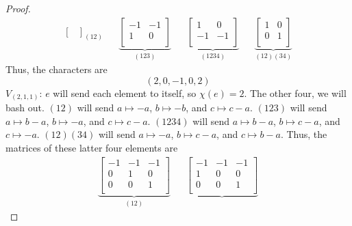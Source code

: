 \documentclass[../psets.tex]{subfiles}
\begin{document}
\begin{enumerate}
\begin{proof}
\begin{align*}
{\begin{bmatrix}
                \end{bmatrix}
            }_{(12)}&&
            \underbrace{
                \begin{bmatrix}
                    -1 & -1\\
                    1 & 0\\
                \end{bmatrix}
            }_{(123)}&&
            \underbrace{
                \begin{bmatrix}
                    1 & 0\\
                    -1 & -1\\
                \end{bmatrix}
            }_{(1234)}&&
            \underbrace{
                \begin{bmatrix}
                    1 & 0\\
                    0 & 1\\
                \end{bmatrix}
            }_{(12)(34)}
        \end{align*}
        Thus, the characters are
        \begin{equation*}
            (2,0,-1,0,2)
        \end{equation*}
        \underline{$V_{(2,1,1)}$}: $e$ will send each element to itself, so $\chi(e)=2$. The other four, we will bash out. $(12)$ will send $a\mapsto -a$, $b\mapsto -b$, and $c\mapsto c-a$. $(123)$ will send $a\mapsto b-a$, $b\mapsto -a$, and $c\mapsto c-a$. $(1234)$ will send $a\mapsto b-a$, $b\mapsto c-a$, and $c\mapsto -a$. $(12)(34)$ will send $a\mapsto -a$, $b\mapsto c-a$, and $c\mapsto b-a$. Thus, the matrices of these latter four elements are
        \begin{align*}
            \underbrace{
                \begin{bmatrix}
                    -1 & -1 & -1\\
                    0 & 1 & 0\\
                    0 & 0 & 1\\
                \end{bmatrix}
            }_{(12)}&&
            \underbrace{
                \begin{bmatrix}
                    -1 & -1 & -1\\
                    1 & 0 & 0\\
                    0 & 0 & 1\\
                \end{bmatrix}
}
\end{align*}
\end{proof}
\end{enumerate}
\end{document}
